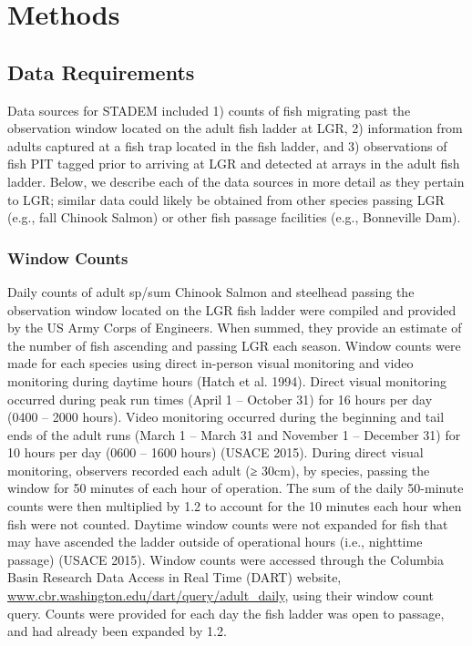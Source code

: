 \documentclass[
  12pt,
]{article}
\begin{document}
\hypertarget{methods}{%
\section{Methods}\label{methods}}

\hypertarget{data-requirements}{%
\subsection{Data Requirements}\label{data-requirements}}

Data sources for STADEM included 1) counts of fish migrating past the observation window located on the adult fish ladder at LGR, 2) information from adults captured at a fish trap located in the fish ladder, and 3) observations of fish PIT tagged prior to arriving at LGR and detected at arrays in the adult fish ladder. Below, we describe each of the data sources in more detail as they pertain to LGR; similar data could likely be obtained from other species passing LGR (e.g., fall Chinook Salmon) or other fish passage facilities (e.g., Bonneville Dam).

\hypertarget{window-counts}{%
\subsubsection{Window Counts}\label{window-counts}}

Daily counts of adult sp/sum Chinook Salmon and steelhead passing the observation window located on the LGR fish ladder were compiled and provided by the US Army Corps of Engineers. When summed, they provide an estimate of the number of fish ascending and passing LGR each season. Window counts were made for each species using direct in-person visual monitoring and video monitoring during daytime hours (Hatch et al. 1994). Direct visual monitoring occurred during peak run times (April 1 -- October 31) for 16 hours per day (0400 -- 2000 hours). Video monitoring occurred during the beginning and tail ends of the adult runs (March 1 -- March 31 and November 1 -- December 31) for 10 hours per day (0600 -- 1600 hours) (USACE 2015). During direct visual monitoring, observers recorded each adult (≥ 30cm), by species, passing the window for 50 minutes of each hour of operation. The sum of the daily 50-minute counts were then multiplied by 1.2 to account for the 10 minutes each hour when fish were not counted. Daytime window counts were not expanded for fish that may have ascended the ladder outside of operational hours (i.e., nighttime passage) (USACE 2015). Window counts were accessed through the Columbia Basin Research Data Access in Real Time (DART) website, \url{www.cbr.washington.edu/dart/query/adult_daily}, using their window count query. Counts were provided for each day the fish ladder was open to passage, and had already been expanded by 1.2.
\end{document}
